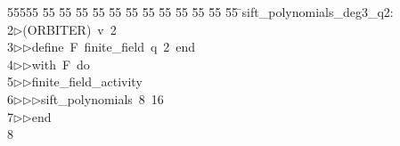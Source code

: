 %
%
\begin{tabbing}
55555 \= 55 \= 55 \= 55 \= 55 \= 55 \= 55 \= 55 \= 55 \= 55 \= 55 \= 55 \= 55 \= \>sift\_polynomials\_deg3\_q2:\\[0pt]
2\>$\triangleright$\>(ORBITER)\ v\ 2\ \\[0pt]
3\>$\triangleright$\>$\triangleright$\>define\ F\ finite\_field\ q\ 2\ end\ \\[0pt]
4\>$\triangleright$\>$\triangleright$\>with\ F\ do\ \\[0pt]
5\>$\triangleright$\>$\triangleright$\>finite\_field\_activity\ \\[0pt]
6\>$\triangleright$\>$\triangleright$\>$\triangleright$\>sift\_polynomials\ 8\ 16\ \\[0pt]
7\>$\triangleright$\>$\triangleright$\>end\\[0pt]
8\>\end{tabbing}
